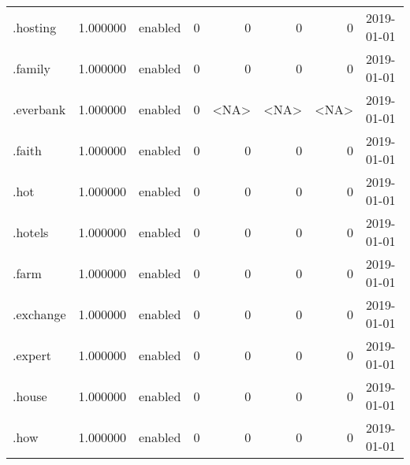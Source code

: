 \begin{tabular}{lrlrrrrl}
.hosting                  &          1.000000 &         enabled &                           0 &                           0 &                           0 &                   0 &           2019-01-01 \\
.family                   &          1.000000 &         enabled &                           0 &                           0 &                           0 &                   0 &           2019-01-01 \\
.everbank                 &          1.000000 &         enabled &                           0 &                        <NA> &                        <NA> &                <NA> &           2019-01-01 \\
.faith                    &          1.000000 &         enabled &                           0 &                           0 &                           0 &                   0 &           2019-01-01 \\
.hot                      &          1.000000 &         enabled &                           0 &                           0 &                           0 &                   0 &           2019-01-01 \\
.hotels                   &          1.000000 &         enabled &                           0 &                           0 &                           0 &                   0 &           2019-01-01 \\
.farm                     &          1.000000 &         enabled &                           0 &                           0 &                           0 &                   0 &           2019-01-01 \\
.exchange                 &          1.000000 &         enabled &                           0 &                           0 &                           0 &                   0 &           2019-01-01 \\
.expert                   &          1.000000 &         enabled &                           0 &                           0 &                           0 &                   0 &           2019-01-01 \\
.house                    &          1.000000 &         enabled &                           0 &                           0 &                           0 &                   0 &           2019-01-01 \\
.how                      &          1.000000 &         enabled &                           0 &                           0 &                           0 &                   0 &           2019-01-01 \\

\end{tabular}
